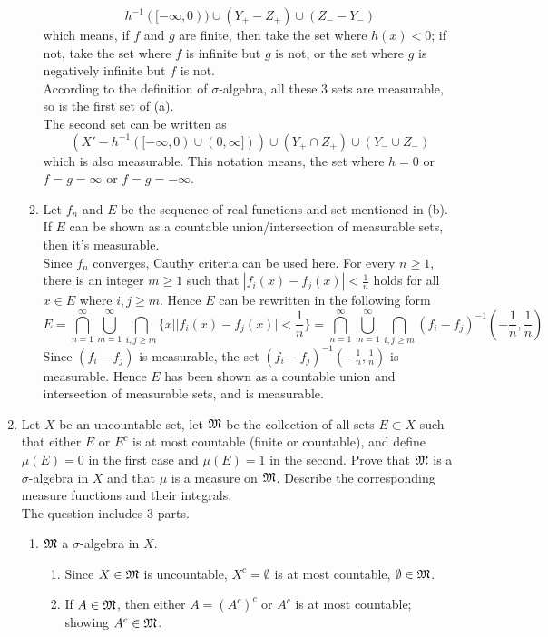 \documentclass{article}
\begin{document}
\begin{enumerate}
\begin{enumerate}
 		\[
 		h^{-1}([-\infty,0))\cup(Y_+-Z_+)\cup(Z_--Y_-)
 		\]
 		which means, if $f$ and $g$ are finite, then take the set where $h(x)<0$; if not, take the set where $f$ is infinite but $g$ is not, or the set where $g$ is negatively infinite but $f$ is not.\\
 		According to the definition of $\sigma$-algebra, all these 3 sets are measurable, so is the first set of (a).\\
 		The second set can be written as
 		\[
 			(X'-h^{-1}([-\infty,0)\cup(0,\infty]))\cup(Y_+\cap{Z_+})\cup(Y_-\cup{Z_-})
 		\]
 		which is also measurable. This notation means, the set where $h=0$ or $f=g=\infty$ or $f=g=-\infty$.
 		\item Let $f_n$ and $E$ be the sequence of real functions and set mentioned in (b). If $E$ can be shown as a countable union/intersection of measurable sets, then it's measurable.\\
 		Since $f_n$ converges, Cauthy criteria can be used here. For every $n\geq 1$, there is an integer $m \geq 1$ such that $|f_i(x)-f_j(x)|<\frac{1}{n}$ holds for all $x\in{E}$ where $i,j\geq m$. Hence $E$ can be rewritten in the following form
 		\[
 			E=\bigcap_{n=1}^{\infty}\bigcup_{m=1}^{\infty}\bigcap_{i,j\geq m}\{x||f_i(x)-f_j(x)|<\frac{1}{n}\}=\bigcap_{n=1}^{\infty}\bigcup_{m=1}^{\infty}\bigcap_{i,j\geq m}(f_i-f_j)^{-1}(-\frac{1}{n},\frac{1}{n})
 		\]
 		Since $(f_i-f_j)$ is measurable, the set $(f_i-f_j)^{-1}(-\frac{1}{n},\frac{1}{n})$ is measurable. Hence $E$ has been shown as a countable union and intersection of measurable sets, and is measurable.
 		\end{enumerate}
 	\item \exercise Let $X$ be an uncountable set, let $\mathfrak{M}$ be the collection of all sets $E\subset X$ such that either $E$ or $E^c$ is at most countable (finite or countable), and define $\mu(E)=0$ in the first case and $\mu(E)=1$ in the second. Prove that $\mathfrak{M}$ is a $\sigma$-algebra in $X$ and that $\mu$ is a measure on $\mathfrak{M}$. Describe the corresponding measure functions and their integrals.\\
 	\solution The question includes 3 parts.
 	\begin{enumerate}
 		\item $\mathfrak{M}$ a $\sigma$-algebra in $X$.
 		\begin{enumerate}
 			\item Since $X\in\mathfrak{M}$ is uncountable, $X^c=\emptyset$ is at most countable, $\emptyset\in\mathfrak{M}$.
 			\item If $A\in\mathfrak{M}$, then either $A=(A^c)^c$ or $A^c$ is at most countable; showing $A^c\in\mathfrak{M}$.

\end{enumerate}
\end{enumerate}
\end{enumerate}
\end{document}
